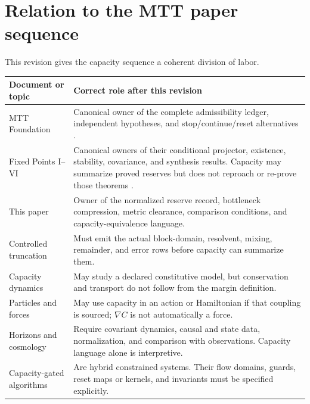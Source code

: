 \documentclass[11pt]{article}
\theoremstyle{definition}
\theoremstyle{remark}
\begin{document}
\section{Relation to the MTT paper sequence}
\label{sec:sequence}

This revision gives the capacity sequence a coherent division of labor.

\begin{center}
\begin{tabularx}{\textwidth}{@{}L{0.28\textwidth}Y@{}}
\toprule
Document or topic & Correct role after this revision \\
\midrule
MTT Foundation
& Canonical owner of the complete admissibility ledger, independent
  hypotheses, and stop/continue/reset alternatives
  \cite{MTTFoundation2026}.\\

Fixed Points I--VI
& Canonical owners of their conditional projector, existence, stability,
  covariance, and synthesis results.  Capacity may summarize proved
  reserves but does not reproach or re-prove those theorems
  \cite{FixedPointsI2026,FixedPointsVI2026}.\\

This paper
& Owner of the normalized reserve record, bottleneck compression, metric
  clearance, comparison conditions, and capacity-equivalence language.\\

Controlled truncation
& Must emit the actual block-domain, resolvent, mixing, remainder, and error
  rows before capacity can summarize them.\\

Capacity dynamics
& May study a declared constitutive model, but conservation and transport
  do not follow from the margin definition.\\

Particles and forces
& May use capacity in an action or Hamiltonian if that coupling is sourced;
  \(\nabla C\) is not automatically a force.\\

Horizons and cosmology
& Require covariant dynamics, causal and state data, normalization, and
  comparison with observations.  Capacity language alone is interpretive.\\

Capacity-gated algorithms
& Are hybrid constrained systems.  Their flow domains, guards, reset maps
  or kernels, and invariants must be specified explicitly.\\
\bottomrule
\end{tabularx}
\end{center}
\end{document}
